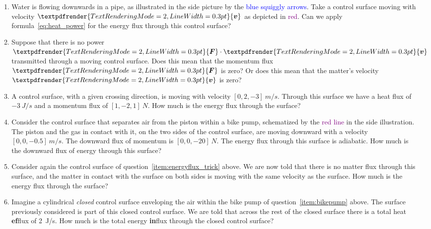 \documentclass[a4paper,12pt,%
onecolumn,oneside,%
british%
]{memoir}
\renewcommand*{\bm}[1]{\textpdfrender{TextRenderingMode=2,LineWidth=0.3pt}{\boldsymbol{#1}}}
\renewcommand*{\|}[1][]{\nonscript\:#1\vert\nonscript\:\mathopen{}}
\newcommand*{\yv}{\bm{v}}
\newcommand*{\yF}{\bm{F}}
\begin{document}
\begin{exercise}
  \begin{enumerate}[exerc]
  \item Water is flowing downwards in a pipe, as illustrated in the side picture by the \textcolor{blue}{blue squiggly arrows}. Take a control surface moving with velocity $\yv$ as depicted in \textcolor{purple}{red}. Can we apply  formula~\eqref{eq:heat_power} for the energy flux through this control surface?

  \item Suppose that there is no power $\yF\cdot\yv$ transmitted through a moving control surface. Does this mean that the momentum flux $\yF$ is zero? Or does this mean that the matter's velocity $\yv$ is zero?

  \item\label{item:energyflux_trick} A control surface, with a given crossing direction, is moving with velocity $[0,2,-3]\:\unit{m/s}$. Through this surface we have a heat flux of $\qty{-3}{J/s}$ and a momentum flux of $[1,-2,1]\:\unit{N}$. How much is the energy flux through the surface?

  \item\label{item:bikepump} Consider the control surface that separates air from the piston within a bike pump, schematized by the \textcolor{purple}{red line} in the side illustration. The piston and the gas in contact with it, on the two sides of the control surface, are moving downward with a velocity $[0,0,-0.5]\:\unit{m/s}$. The downward flux of momentum is $[0,0,-20]\:\unit{N}$. The energy flux through this surface is adiabatic. How much is the downward flux of energy through this surface?

  \item Consider again the control surface of question~\ref{item:energyflux_trick} above. We are now told that there is no matter flux through this surface, and the matter in contact with the surface on both sides is moving with the same velocity as the surface. How much is the energy flux through the surface?

  \item Imagine a cylindrical \emph{closed} control surface enveloping the air within the bike pump of question~\ref{item:bikepump} above. The surface previously considered is part of this closed control surface. We are told that across the rest of the closed surface there is a total heat \textbf{ef}flux of \qty{2}{J/s}. How much is the total energy \textbf{in}flux through the closed control surface?
  \end{enumerate}
\end{exercise}
\end{document}
